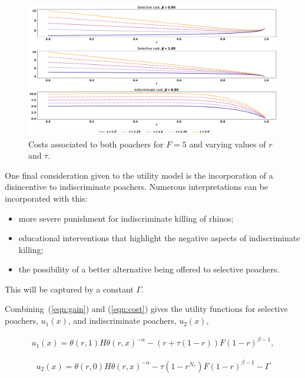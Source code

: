 \documentclass[10pt]{article}
\begin{document}
\begin{figure}[!htbp]
    \begin{center}
        \includegraphics[width=\linewidth]{images/betas_curve.pdf}
        \caption{Costs associated to both poachers for \(F=5\) and varying
        values of \(r\) and \(\tau\).}\label{fig:CostCurves}
    \end{center}
\end{figure}

One final consideration given to the utility model is the incorporation of a
disincentive to indiscriminate poachers. Numerous interpretations can be
incorporated with this:

\begin{itemize}
    \item more severe punishment for indiscriminate killing of rhinos;
    \item educational interventions that highlight the negative aspects of
        indiscriminate killing;
    \item the possibility of a better alternative being offered to selective
        poachers.
\end{itemize}

This will be captured by a constant \(\Gamma\).

\noindent Combining~(\ref{eqn:gain}) and (\ref{eqn:cost}) gives the utility
functions for selective poachers, \(u_1(x)\), and indiscriminate poachers,
\(u_2(x)\),

\begin{equation}
    \begin{split}
\label{eqn:USchi}
u_1(x) = \theta(r,1) H \theta(r,x)^{-\alpha}
           - (r+ \tau (1-r))F (1-r)^{\beta - 1} ,
    \end{split}
\end{equation}

\begin{equation}
    \begin{split}
\label{eqn:UnotSchi}
u_2(x) = \theta(r,0) H \theta(r,x)^{-\alpha} - \tau (1 - r^{N_r})F(1-r)^{\beta-1}
- \Gamma
\end{split}
\end{equation}
\end{document}
